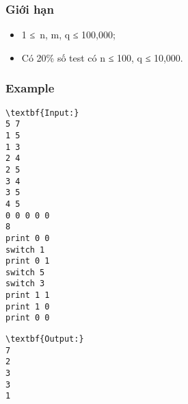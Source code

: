 \subsubsection{Giới hạn}
\begin{itemize}
	\item 1 ≤ n, m, q ≤ 100,000;
	\item Có 20\% số test có n ≤ 100, q ≤ 10,000.
\end{itemize}

\subsubsection{Example}
\begin{verbatim}
\textbf{Input:}
5 7
1 5
1 3
2 4
2 5
3 4
3 5
4 5
0 0 0 0 0
8
print 0 0
switch 1
print 0 1
switch 5
switch 3
print 1 1
print 1 0
print 0 0
\end{verbatim}
\begin{verbatim}
\textbf{Output:}
7
2
3
3
1

\end{verbatim}